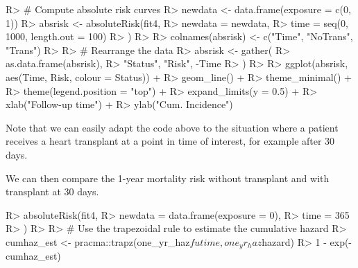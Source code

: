 \documentclass[
]{jss}
\begin{document}
\begin{CodeChunk}

\begin{CodeInput}
R> # Compute absolute risk curves
R> newdata <- data.frame(exposure = c(0, 1))
R> absrisk <- absoluteRisk(fit4,
R>   newdata = newdata,
R>   time = seq(0, 1000, length.out = 100)
R> )
R> 
R> colnames(absrisk) <- c("Time", "NoTrans", "Trans")
R> 
R> # Rearrange the data
R> absrisk <- gather(
R>   as.data.frame(absrisk),
R>   "Status", "Risk", -Time
R> )
R> 
R> ggplot(absrisk, aes(Time, Risk, colour = Status)) +
R>   geom_line() +
R>   theme_minimal() +
R>   theme(legend.position = "top") +
R>   expand_limits(y = 0.5) +
R>   xlab("Follow-up time") +
R>   ylab("Cum. Incidence")
\end{CodeInput}
\end{CodeChunk}

Note that we can easily adapt the code above to the situation where a
patient receives a heart transplant at a point in time of interest, for
example after 30 days.

\begin{CodeChunk}

\end{CodeChunk}

We can then compare the 1-year mortality risk without transplant and
with transplant at 30 days.

\begin{CodeChunk}

\begin{CodeInput}
R> absoluteRisk(fit4,
R>   newdata = data.frame(exposure = 0),
R>   time = 365
R> )
R> 
R> # Use the trapezoidal rule to estimate the cumulative hazard
R> cumhaz_est <- pracma::trapz(one_yr_haz$futime, one_yr_haz$hazard)
R> 1 - exp(-cumhaz_est)
\end{CodeInput}
\end{CodeChunk}
\end{document}
